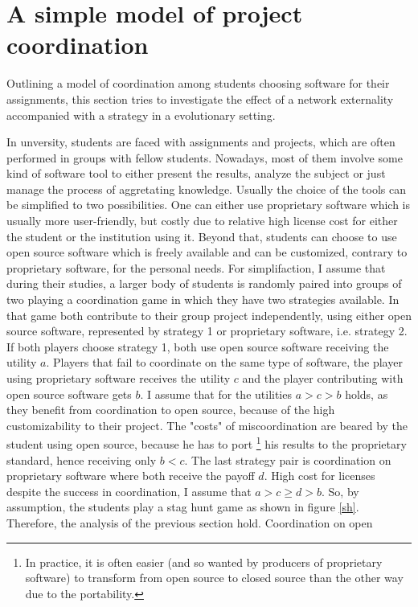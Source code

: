 \documentclass[11pt]{article}
\begin{document}
\section{A simple model of project coordination}
Outlining a model of coordination among students choosing software for their
assignments, this section tries to investigate the effect of a network 
externality accompanied with a strategy in a evolutionary setting.

In unversity, students are faced with assignments and projects, which are 
often performed in groups with fellow students.
Nowadays, most of them involve some kind of software tool to either present 
the results, analyze the subject or just manage the process of aggretating 
knowledge. Usually the choice of the tools can be simplified to two 
possibilities. One can either use proprietary software
which is usually more user-friendly, but costly due to relative high 
license cost for either the student or the institution using it. 
Beyond that, students can choose to use open source software which is freely
available and can be customized, contrary to proprietary software,
for the personal needs. 
For simplifaction, I assume that during their studies, a larger body of 
students is randomly paired into groups of two playing a coordination game
in which they have two strategies available. In that game both contribute 
to their group project independently, using either open source software, 
represented by strategy 1 or proprietary software, i.e. strategy 2.
If both players choose strategy 1, both use open source software receiving 
the utility $a$. Players that fail to coordinate on the same type of
software, the player using proprietary software receives the utility $c$ and
the player contributing with open source software gets $b$. I assume that 
for the utilities $a>c>b$ holds, 
as they benefit from coordination to open source,
because of the high customizability to their project. The "costs" of 
miscoordination are beared by the student using open source, because he has
to port \footnote{In practice, it is
often easier (and so wanted by producers of proprietary software) to
transform from open source to closed source than the other way due to the
portability.} his results to the proprietary standard, hence receiving only
$b < c$. The last strategy pair is coordination on proprietary software where
both receive the payoff $d$. High cost for licenses despite the success 
in coordination, I assume that $a>c\geq d>b$. So, by assumption, the students
play a stag hunt game as shown in figure \ref{sh}.
Therefore, the analysis of the previous section hold. Coordination on open
\end{document}
